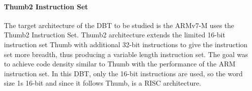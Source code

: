 \paragraph{Thumb2 Instruction Set} The target architecture of the DBT to be studied is the ARMv7-M uses the Thumb2 Instruction Set. Thumb2 architecture extends the limited 16-bit instruction set Thumb with additional 32-bit instructions to give the instruction set more breadth, thus producing a variable length instruction set. The goal was to achieve code density similar to Thumb with the performance of the ARM instruction set. In this DBT, only the 16-bit instructions are used, so the word size 1s 16-bit and since it follows Thumb, is a RISC architecture.




